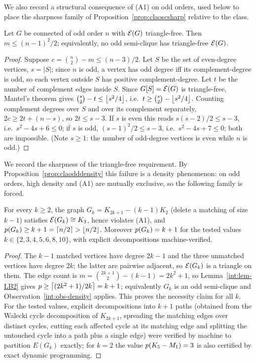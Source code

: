 We also record a structural consequence of (A1) on odd orders, used below
to place the sharpness family of Proposition~\ref{prop:claoscsharp}
relative to the class.

\begin{proposition}\label{prop:claodddensity}
Let $G$ be connected of odd order $n$ with $\mathcal{E}(G)$ triangle-free. Then
$m\le (n-1)^2/2$; equivalently, no odd semi-clique has triangle-free
$\mathcal{E}(G)$.
\end{proposition}
\begin{proof}
Suppose $c=\binom{n}{2}-m\le (n-3)/2$. Let $S$ be the set of even-degree
vertices, $s=|S|$; since $n$ is odd, a vertex has odd degree iff its
complement-degree is odd, so each vertex outside $S$ has positive
complement-degree. Let $t$ be the number of complement edges inside $S$.
Since $G[S]=\mathcal{E}(G)$ is triangle-free, Mantel's theorem gives
$\binom{s}{2}-t\le\left\lfloor s^2/4 \right\rfloor$, i.e.\ $t\ge \binom{s}{2}-\left\lfloor s^2/4 \right\rfloor$.
Counting complement degrees over $S$ and over its complement separately,
$2c\ge 2t+(n-s)$, so $2t\le s-3$. If $s$ is even this reads
$s(s-2)/2\le s-3$, i.e.\ $s^2-4s+6\le0$; if $s$ is odd,
$(s-1)^2/2\le s-3$, i.e.\ $s^2-4s+7\le0$; both are impossible. (Note
$s\ge1$: the number of odd-degree vertices is even while $n$ is odd.)
\end{proof}

We record the sharpness of the triangle-free requirement. By
Proposition~\ref{prop:claodddensity} this failure is a density phenomenon:
on odd orders, high density and (A1) are mutually exclusive, so the
following family is forced.

\begin{proposition}\label{prop:claoscsharp}
For every $k\ge 2$, the graph $G_k=K_{2k+1}-(k-1)K_2$ (delete a matching
of size $k-1$) satisfies $\mathcal{E}(G_k)\cong K_3$, hence violates (A1), and
$p(G_k)\ge k+1=\left\lceil n/2 \right\rceil>\left\lfloor n/2 \right\rfloor$. Moreover $p(G_k)=k+1$ for the
tested values $k\in\{2,3,4,5,6,8,10\}$, with explicit decompositions
machine-verified.
\end{proposition}

\begin{proof}
The $k-1$ matched vertices have degree $2k-1$ and the three unmatched
vertices have degree $2k$; the latter are pairwise adjacent, so
$\mathcal{E}(G_k)$ is a triangle on them. The edge count is
$m=\binom{2k+1}{2}-(k-1)=2k^2+1$, so Lemma~\ref{int:lem-LB2} gives
$p\ge\left\lceil (2k^2+1)/2k \right\rceil=k+1$; equivalently $G_k$ is an odd semi-clique
and Observation~\ref{int:obs-density} applies. This proves the necessity
claim for all $k$. For the tested values, explicit decompositions into
$k+1$ paths (obtained from the Walecki cycle decomposition of $K_{2k+1}$,
spreading the matching edges over distinct cycles, cutting each affected
cycle at its matching edge and splitting the untouched cycle into a path
plus a single edge) were verified by machine to partition $E(G_k)$
exactly; for $k=2$ the value $p(K_5-M_1)=3$ is also certified by exact
dynamic programming.
\end{proof}

